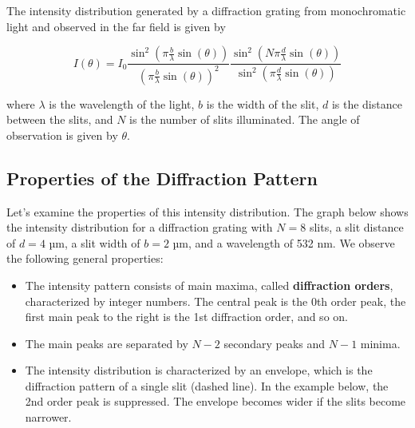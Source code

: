 \documentclass[
  a4paper,
]{book}
\providecommand{\tightlist}{%
  \setlength{\itemsep}{0pt}\setlength{\parskip}{0pt}}
\begin{document}
\begin{tcolorbox}[enhanced jigsaw, coltitle=black, title=\textcolor{quarto-callout-note-color}{\faInfo}\hspace{0.5em}{Diffraction Grating}, colframe=quarto-callout-note-color-frame, toprule=.15mm, opacitybacktitle=0.6, left=2mm, opacityback=0, breakable, toptitle=1mm, bottomtitle=1mm, leftrule=.75mm, arc=.35mm, titlerule=0mm, colbacktitle=quarto-callout-note-color!10!white, rightrule=.15mm, bottomrule=.15mm, colback=white]

The intensity distribution generated by a diffraction grating from
monochromatic light and observed in the far field is given by

\[
I(\theta) = I_0 \frac{\sin^2\left(\pi \frac{b}{\lambda} \sin(\theta)\right)}{\left(\pi \frac{b}{\lambda} \sin(\theta)\right)^2} \frac{\sin^2\left(N \pi \frac{d}{\lambda} \sin(\theta)\right)}{\sin^2\left(\pi \frac{d}{\lambda} \sin(\theta)\right)}
\]

where \(\lambda\) is the wavelength of the light, \(b\) is the width of
the slit, \(d\) is the distance between the slits, and \(N\) is the
number of slits illuminated. The angle of observation is given by
\(\theta\).

\end{tcolorbox}

\subsection{Properties of the Diffraction
Pattern}\label{properties-of-the-diffraction-pattern}

Let's examine the properties of this intensity distribution. The graph
below shows the intensity distribution for a diffraction grating with
\(N=8\) slits, a slit distance of \(d=4\) µm, a slit width of \(b=2\)
µm, and a wavelength of 532 nm. We observe the following general
properties:

\begin{itemize}
\tightlist
\item
  The intensity pattern consists of main maxima, called
  \textbf{diffraction orders}, characterized by integer numbers. The
  central peak is the 0th order peak, the first main peak to the right
  is the 1st diffraction order, and so on.
\item
  The main peaks are separated by \(N-2\) secondary peaks and \(N-1\)
  minima.
\item
  The intensity distribution is characterized by an envelope, which is
  the diffraction pattern of a single slit (dashed line). In the example
  below, the 2nd order peak is suppressed. The envelope becomes wider if
  the slits become narrower.
\end{itemize}
\end{document}
